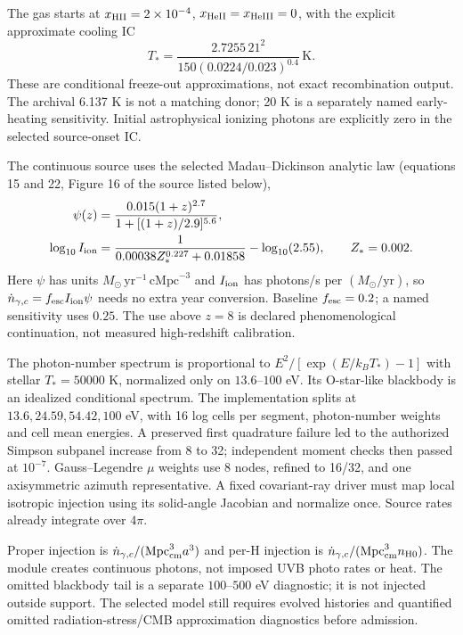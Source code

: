 \documentclass[11pt]{article}
\begin{document}
The gas starts at $x_{\rm HII}=2\times10^{-4}$, $x_{\rm HeII}=x_{\rm HeIII}=0$, with the explicit approximate cooling IC
\begin{equation}
T_*=\frac{2.7255\,21^2}{150(0.0224/0.023)^{0.4}}\,\mathrm K.
\end{equation}
These are conditional freeze-out approximations, not exact recombination output. The archival 6.137 K is not a matching donor; 20 K is a separately named early-heating sensitivity. Initial astrophysical ionizing photons are explicitly zero in the selected source-onset IC.

The continuous source uses the selected Madau--Dickinson analytic law (equations 15 and 22, Figure 16 of the source listed below),
\begin{align}
\psi(z)&=\frac{0.015(1+z)^{2.7}}{1+[(1+z)/2.9]^{5.6}},\\
\log_{10}I_{\rm ion}&=\frac{1}{0.00038Z_*^{0.227}+0.01858}-\log_{10}(2.55),\qquad Z_*=0.002.
\end{align}
Here $\psi$ has units $M_\odot\,\mathrm{yr}^{-1}\,\mathrm{cMpc}^{-3}$ and $I_{\rm ion}$ has photons/s per $(M_\odot/\mathrm{yr})$, so $\dot n_{\gamma,c}=f_{\rm esc}I_{\rm ion}\psi$ needs no extra year conversion. Baseline $f_{\rm esc}=0.2$; a named sensitivity uses $0.25$. The use above $z=8$ is declared phenomenological continuation, not measured high-redshift calibration.

The photon-number spectrum is proportional to $E^2/[\exp(E/k_BT_*)-1]$ with stellar $T_*=50000$ K, normalized only on $13.6$--$100$ eV. Its O-star-like blackbody is an idealized conditional spectrum. The implementation splits at $13.6,24.59,54.42,100$ eV, with 16 log cells per segment, photon-number weights and cell mean energies. A preserved first quadrature failure led to the authorized Simpson subpanel increase from 8 to 32; independent moment checks then passed at $10^{-7}$. Gauss--Legendre $\mu$ weights use 8 nodes, refined to 16/32, and one axisymmetric azimuth representative. A fixed covariant-ray driver must map local isotropic injection using its solid-angle Jacobian and normalize once. Source rates already integrate over $4\pi$.

Proper injection is $\dot n_{\gamma,c}/(\mathrm{Mpc}_{\rm cm}^3a^3)$ and per-H injection is $\dot n_{\gamma,c}/(\mathrm{Mpc}_{\rm cm}^3n_{\rm H0})$. The module creates continuous photons, not imposed UVB photo rates or heat. The omitted blackbody tail is a separate $100$--$500$ eV diagnostic; it is not injected outside support. The selected model still requires evolved histories and quantified omitted radiation-stress/CMB approximation diagnostics before admission.
\end{document}
